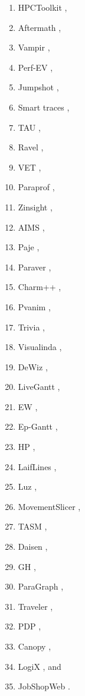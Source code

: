 \begin{refsection}
\begin{enumerate}
\item HPCToolkit \cite{adhianto2010hpctoolkit},
\item Aftermath \cite{drebes2014aftermath},
\item Vampir \cite{nagel1996vampir},
\item Perf-EV \cite{pinto2016analyzing},
\item Jumpshot \cite{zaki1999toward},
\item Smart traces \cite{osmari2014visualization},
\item TAU \cite{xie2018performance},
\item Ravel \cite{isaacs2014combing},
\item VET \cite{haugen2015visualizing},
\item Paraprof \cite{bell2003paraprof},
\item Zinsight \cite{de2010zinsight},
\item AIMS \cite{yan1995performance},
\item Paje \cite{de2000paje},
\item Paraver \cite{pillet1995paraver},
\item Charm++ \cite{kale2006scaling},
\item Pvanim \cite{topol1998pvanim},
\item Trivia \cite{schnorr2010triva},
\item Visualinda \cite{koike1997visualinda},
\item DeWiz \cite{schaubschlaeger2003event},
\item LiveGantt \cite{jo2014livegantt},
\item EW \cite{tang2021visualization},
\item Ep-Gantt \cite{antweiler2022uncovering},
\item HP \cite{fails2006visual},
\item LaifLines \cite{plaisant1998information},
\item Luz \cite{luz2010improving},
\item MovementSlicer \cite{gupta2016movementslicer},
\item TASM \cite{tory2013comparative},
\item Daisen \cite{sun2021daisen},
\item GH \cite{hirakata2022exploring},
\item ParaGraph \cite{heath1991visualizing},
\item Traveler \cite{sakin2022traveler},
\item PDP \cite{nesi2023summarizing},
\item Canopy \cite{kaldor2017canopy},
\item LogiX \cite{dkabrowski2024manufacturing}, and
\item JobShopWeb \cite{loch431proposal}.
\end{enumerate}


\end{refsection}
